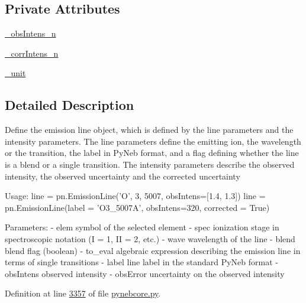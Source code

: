 \subsection*{Private Attributes}
\begin{DoxyCompactItemize}
\item 
\hyperlink{classpyneb_1_1core_1_1pynebcore_1_1_emission_line_a87753879f7fa6ac6a40e05bc0e5c3c72}{\-\_\-obs\-Intens\-\_\-n}
\item 
\hyperlink{classpyneb_1_1core_1_1pynebcore_1_1_emission_line_aa1f44ce8f6be439b590589c08da84fc2}{\-\_\-corr\-Intens\-\_\-n}
\item 
\hyperlink{classpyneb_1_1core_1_1pynebcore_1_1_emission_line_a1828e90dccac2948129b7052c54eedf5}{\-\_\-unit}
\end{DoxyCompactItemize}


\subsection{Detailed Description}
\begin{DoxyVerb}Define the emission line object, which is defined by the line parameters and the intensity 
    parameters.
The line parameters define the emitting ion, the wavelength or the transition, the label 
    in PyNeb format, and a flag defining whether the line is a blend or a single transition. 
The intensity parameters describe the observed intensity, the observed uncertainty and 
    the corrected uncertainty
    
Usage:
    line = pn.EmissionLine('O', 3, 5007, obsIntens=[1.4, 1.3])
    line = pn.EmissionLine(label = 'O3_5007A', obsIntens=320, corrected = True)

Parameters:
    - elem        symbol of the selected element
    - spec        ionization stage in spectroscopic notation (I = 1, II = 2, etc.)
    - wave        wavelength of the line
    - blend       blend flag (boolean)
    - to_eval     algebraic expression describing the emission line in terms of single transitions
    - label       line label in the standard PyNeb format
    - obsIntens   observed intensity
    - obsError    uncertainty on the observed intensity\end{DoxyVerb}
 

Definition at line \hyperlink{pynebcore_8py_source_l03357}{3357} of file \hyperlink{pynebcore_8py_source}{pynebcore.\-py}.



